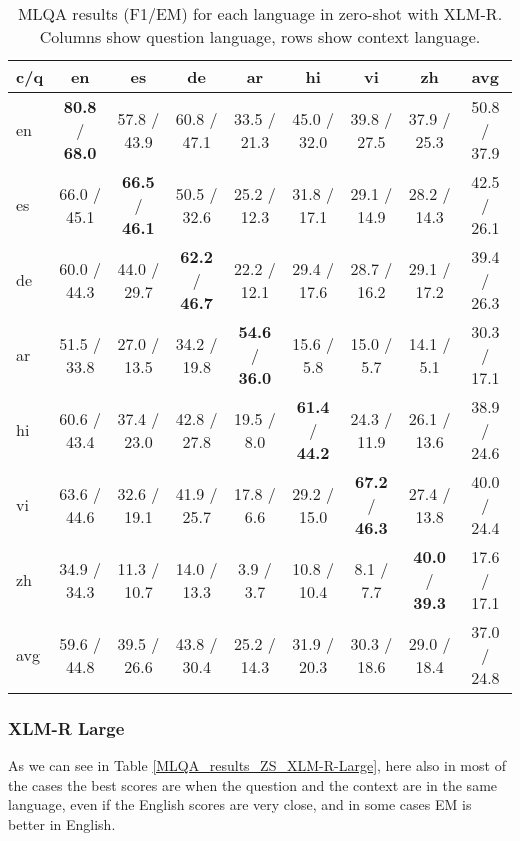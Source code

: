 \documentclass[11pt]{article}
\begin{document}
\begin{table*}[!ht]
    \centering
    \begin{adjustbox}{max width=\textwidth}
    \begin{tabular}{l|ccccccc|c}
    \toprule
        c/q & en & es & de & ar & hi & vi & zh & avg \\ \midrule
        en & \textbf{80.8} / \textbf{68.0} & 57.8 / 43.9 & 60.8 / 47.1 & 33.5 / 21.3 & 45.0 / 32.0 & 39.8 / 27.5 & 37.9 / 25.3 & 50.8 / 37.9 \\ 
        es & 66.0 / 45.1 & \textbf{66.5} / \textbf{46.1} & 50.5 / 32.6 & 25.2 / 12.3 & 31.8 / 17.1 & 29.1 / 14.9 & 28.2 / 14.3 & 42.5 / 26.1 \\ 
        de & 60.0 / 44.3 & 44.0 / 29.7 & \textbf{62.2} / \textbf{46.7} & 22.2 / 12.1 & 29.4 / 17.6 & 28.7 / 16.2 & 29.1 / 17.2 & 39.4 / 26.3 \\ 
        ar & 51.5 / 33.8 & 27.0 / 13.5 & 34.2 / 19.8 & \textbf{54.6} / \textbf{36.0} & 15.6 / 5.8 & 15.0 / 5.7 & 14.1 / 5.1 & 30.3 / 17.1 \\ 
        hi & 60.6 / 43.4 & 37.4 / 23.0 & 42.8 / 27.8 & 19.5 / 8.0 & \textbf{61.4} / \textbf{44.2} & 24.3 / 11.9 & 26.1 / 13.6 & 38.9 / 24.6 \\ 
        vi & 63.6 / 44.6 & 32.6 / 19.1 & 41.9 / 25.7 & 17.8 / 6.6 & 29.2 / 15.0 & \textbf{67.2} / \textbf{46.3} & 27.4 / 13.8 & 40.0 / 24.4 \\ 
        zh & 34.9 / 34.3 & 11.3 / 10.7 & 14.0 / 13.3 & 3.9 / 3.7 & 10.8 / 10.4 & 8.1 / 7.7 & \textbf{40.0} / \textbf{39.3} & 17.6 / 17.1 \\ \midrule
        avg & 59.6 / 44.8 & 39.5 / 26.6 & 43.8 / 30.4 & 25.2 / 14.3 & 31.9 / 20.3 & 30.3 / 18.6 & 29.0 / 18.4 & 37.0 / 24.8 \\ \bottomrule
    \end{tabular}
    \end{adjustbox}
    \caption{MLQA results (F1/EM) for each language in zero-shot with XLM-R. Columns show question language, rows show context language.}
    \label{MLQA_results_ZS_XLM-R}
\end{table*}


\subsubsection{XLM-R Large}

As we can see in Table \ref{MLQA_results_ZS_XLM-R-Large}, here also in most of the cases the best scores are when the question and the context are in the same language, even if the English scores are very close, and in some cases EM is better in English.
\end{document}

